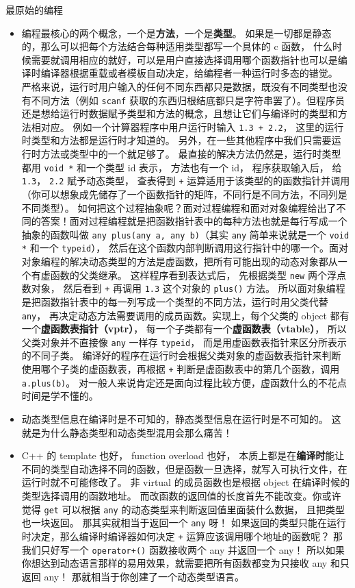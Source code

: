 
\begin{issues}
\issueDraft
\end{issues}

最原始的编程
\begin{itemize}
\item 编程最核心的两个概念，一个是\textbf{方法}，一个是\textbf{类型}。 如果是一切都是静态的，那么可以把每个方法结合每种适用类型都写一个具体的 c 函数， 什么时候需要就调用相应的就好，可以是用户直接选择调用哪个函数指针也可以是编译时编译器根据重载或者模板自动决定，给编程者一种运行时多态的错觉。 严格来说，运行时用户输入的任何不同东西都只是数据，既没有不同类型也没有不同方法（例如 \verb`scanf` 获取的东西归根结底都只是字符串罢了）。但程序员还是想给运行时数据赋予类型和方法的概念，且想让它们与编译时的类型和方法相对应。 例如一个计算器程序中用户运行时输入 \verb`1.3 + 2.2`， 这里的运行时类型和方法都是运行时才知道的。 另外，在一些其他程序中我们只需要运行时方法或类型中的一个就足够了。 最直接的解决方法仍然是，运行时类型都用 \verb`void *` 和一个类型 id 表示， 方法也有一个 id， 程序获取输入后， 给 \verb`1.3`， \verb`2.2` 赋予动态类型， 查表得到 \verb`+` 运算适用于该类型的的函数指针并调用（你可以想象成先储存了一个函数指针的矩阵，不同行是不同方法，不同列是不同类型）。 如何把这个过程抽象呢？面对过程编程和面对对象编程给出了不同的答案！面对过程编程就是把函数指针表中的每种方法也就是每行写成一个抽象的函数叫做 \verb`any plus(any a, any b)`（其实 \verb`any` 简单来说就是一个 \verb`void *` 和一个 \verb`typeid`）， 然后在这个函数内部判断调用这行指针中的哪一个。面对对象编程的解决动态类型的方法是虚函数，把所有可能出现的动态对象都从一个有虚函数的父类继承。 这样程序看到表达式后， 先根据类型 \verb`new` 两个浮点数对象， 然后看到 \verb`+` 再调用 \verb`1.3` 这个对象的 \verb`plus()` 方法。 所以面对象编程是把函数指针表中的每一列写成一个类型的不同方法，运行时用父类代替 \verb`any`， 再决定动态方法需要调用的成员函数。实现上，每个父类的 object 都有一个\textbf{虚函数表指针（vptr）}， 每一个子类都有一个\textbf{虚函数表（vtable）}， 所以父类对象并不直接像 \verb`any` 一样存 \verb`typeid`， 而是用虚函数表指针来区分所表示的不同子类。 编译好的程序在运行时会根据父类对象的虚函数表指针来判断使用哪个子类的虚函数表，再根据 \verb`+` 判断是虚函数表中的第几个函数，调用 \verb`a.plus(b)`。 对一般人来说肯定还是面向过程比较方便，虚函数什么的不花点时间是学不懂的。
\item 动态类型信息在编译时是不可知的，静态类型信息在运行时是不可知的。 这就是为什么静态类型和动态类型混用会那么痛苦！
\item C++ 的 template 也好， function overload 也好， 本质上都是在\textbf{编译时}能让不同的类型自动选择不同的函数，但是函数一旦选择，就写入可执行文件，在运行时就不可能修改了。 非 virtual 的成员函数也是根据 object 在编译时候的类型选择调用的函数地址。 而改函数的返回值的长度首先不能改变。你或许觉得 \verb`get` 可以根据 \verb`any` 的动态类型来判断返回值里面装什么数据， 且把类型也一块返回。 那其实就相当于返回一个 \verb`any` 呀！ 如果返回的类型只能在运行时决定，那么编译时编译器如何决定 \verb`+` 运算应该调用哪个地址的函数呢？ 那我们只好写一个 \verb`operator+()` 函数接收两个 any 并返回一个 any！ 所以如果你想达到动态语言那样的易用效果，就需要把所有函数都变为只接收 any 和只返回 any！ 那就相当于你创建了一个动态类型语言。

\end{itemize}
